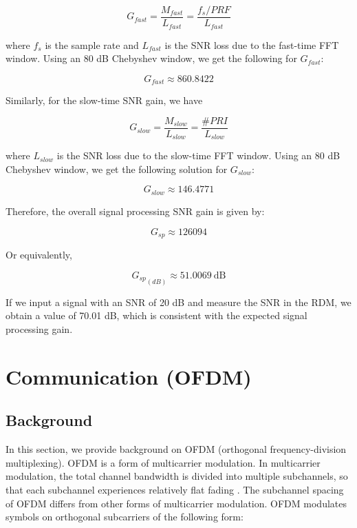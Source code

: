 \documentclass[conference]{IEEEtran}
\begin{document}
	\begin{equation}
		 G_{fast} = \frac{M_{fast}}{L_{fast}} = \frac{f_s/PRF}{L_{fast}}
		 \label{eq::fmcw_fast_time_snr_gain}
	\end{equation}
		
	where $f_s$ is the sample rate and $L_{fast}$ is the SNR loss due to the fast-time FFT window. Using an 80 dB Chebyshev window, we get the following for $G_{fast}$:
	
	\begin{equation}
		G_{fast} \approx 860.8422
	\end{equation}
	
	Similarly, for the slow-time SNR gain, we have
	
	\begin{equation}
		G_{slow} = \frac{M_{slow}}{L_{slow}} = \frac{\#PRI}{L_{slow}}
	\end{equation}
		
	where $L_{slow}$ is the SNR loss due to the slow-time FFT window. Using an 80 dB Chebyshev window, we get the following solution for $G_{slow}$:
	
	\begin{equation}
		G_{slow} \approx 146.4771
	\end{equation}
	
	Therefore, the overall signal processing SNR gain is given by:
	
	\begin{equation}
		G_{sp} \approx 126094
	\end{equation}
	
	Or equivalently,
	
	\begin{equation}
		 {G_{sp}}_{(dB)} \approx 51.0069\ \text{dB}
	\end{equation}
	
	If we input a signal with an SNR of 20 dB and measure the SNR in the RDM, we obtain a value of 70.01 dB, which is consistent with the expected signal processing gain.
		
     \section {Communication (OFDM)}
     
	 \subsection {Background}
	 
	 	In this section, we provide background on OFDM (orthogonal frequency-division multiplexing). OFDM is a form of multicarrier modulation. In multicarrier modulation, the total channel bandwidth is divided into multiple subchannels, so that each subchannel experiences relatively flat fading \cite{djordjevic-2017}. The subchannel spacing of OFDM differs from other forms of multicarrier modulation. OFDM modulates symbols on orthogonal subcarriers of the following form:
	 	
\end{document}
